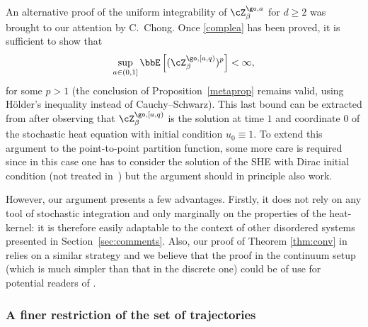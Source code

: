 \begin{rem}\label{chongsremark}
An alternative proof of the uniform integrability of $\cZ^{\go,a}_{\beta}$ for $d\ge 2$ was brought to our attention by C.\ Chong.
Once \eqref{complea} has been proved, it is sufficient to show that
\begin{equation}\label{lpbounded}
\sup_{a\in(0,1]}\bbE\left[(\cZ^{\go,[a,q)}_{\beta})^p\right]<\infty,
\end{equation}
for some $p>1$ (the conclusion of Proposition~\ref{metaprop} remains valid, using Hölder's inequality instead of Cauchy--Schwarz).
This last bound can be extracted from \hbox{\cite[Th.\,1.3.1]{Loubert98}} after observing that $\cZ^{\go,[a,q)}_{\beta}$ is the solution at time $1$ and coordinate $0$ of the stochastic heat equation with initial condition $u_0\equiv 1$. To extend this argument to the point-to-point partition function, some more care is required since in this case one has to consider the solution of the SHE with Dirac initial condition (not treated in~\cite{Loubert98}) but the argument should in principle also work.

However, our argument presents a few advantages.
Firstly, it does not rely on any tool of stochastic integration and only marginally on the properties of the heat-kernel: it is therefore easily adaptable to the context of other disordered systems presented in Section~\ref{sec:comments}.
Also, our proof of Theorem \ref{thm:conv} in \cite{BL20_disc} relies on a similar strategy and we believe that the proof in the continuum setup (which is much simpler than that in the discrete one) could be of use for potential readers of
\cite{BL20_disc}.
\end{rem}

\subsubsection{A finer restriction of the set of trajectories}

